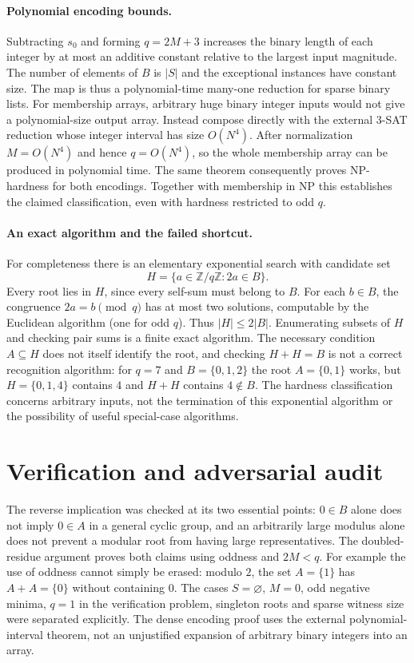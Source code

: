 \documentclass[11pt]{article}
\begin{document}
\paragraph{Polynomial encoding bounds.}
Subtracting $s_0$ and forming $q=2M+3$ increases the binary length of each
integer by at most an additive constant relative to the largest input magnitude.
The number of elements of $B$ is $|S|$ and the exceptional instances have
constant size. The map is thus a polynomial-time many-one reduction for sparse
binary lists. For membership arrays, arbitrary huge binary integer inputs would
not give a polynomial-size output array. Instead compose directly with the
external 3-SAT reduction whose integer interval has size $O(N^4)$.
After normalization $M=O(N^4)$ and hence $q=O(N^4)$, so the whole membership
array can be produced in polynomial time. The same theorem consequently proves
NP-hardness for both encodings. Together with membership in NP this establishes
the claimed classification, even with hardness restricted to odd $q$.

\paragraph{An exact algorithm and the failed shortcut.}
For completeness there is an elementary exponential search with candidate set
\[
 H=\{a\in\mathbb Z/q\mathbb Z:2a\in B\}.
\]
Every root lies in $H$, since every self-sum must belong to $B$.
For each $b\in B$, the congruence $2a=b\pmod q$ has at most two solutions,
computable by the Euclidean algorithm (one for odd $q$). Thus $|H|\leq2|B|$.
Enumerating subsets of $H$ and checking pair sums is a finite exact algorithm.
The necessary condition $A\subseteq H$ does not itself identify the root, and
checking $H+H=B$ is not a correct recognition algorithm: for $q=7$ and
$B=\{0,1,2\}$ the root $A=\{0,1\}$ works, but $H=\{0,1,4\}$ contains
$4$ and $H+H$ contains $4\notin B$.
The hardness classification concerns arbitrary inputs, not the termination of
this exponential algorithm or the possibility of useful special-case algorithms.

\section{Verification and adversarial audit}

The reverse implication was checked at its two essential points: $0\in B$ alone
does not imply $0\in A$ in a general cyclic group, and an arbitrarily large
modulus alone does not prevent a modular root from having large representatives.
The doubled-residue argument proves both claims using oddness and $2M<q$.
For example the use of oddness cannot simply be erased: modulo $2$, the set
$A=\{1\}$ has $A+A=\{0\}$ without containing $0$.
The cases $S=\varnothing$, $M=0$, odd negative minima, $q=1$ in the verification
problem, singleton roots and sparse witness size were separated explicitly.
The dense encoding proof uses the external polynomial-interval theorem, not
an unjustified expansion of arbitrary binary integers into an array.
\end{document}
